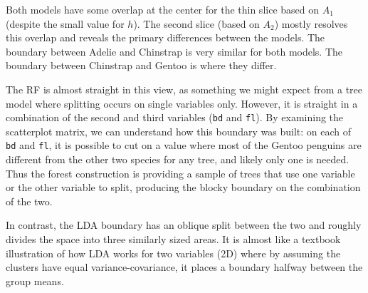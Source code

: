 \documentclass[]{interact}
\theoremstyle{plain}%
\theoremstyle{definition}
\theoremstyle{remark}
\begin{document}
Both models have some overlap at the center for the thin slice based on
\(A_1\) (despite the small value for \(h\)). The second slice (based on
\(A_2\)) mostly resolves this overlap and reveals the primary
differences between the models. The boundary between Adelie and
Chinstrap is very similar for both models. The boundary between
Chinstrap and Gentoo is where they differ.

The RF is almost straight in this view, as something we might expect
from a tree model where splitting occurs on single variables only.
However, it is straight in a combination of the second and third
variables (\texttt{bd} and \texttt{fl}). By examining the scatterplot
matrix, we can understand how this boundary was built: on each of
\texttt{bd} and \texttt{fl}, it is possible to cut on a value where most
of the Gentoo penguins are different from the other two species for any
tree, and likely only one is needed. Thus the forest construction is
providing a sample of trees that use one variable or the other variable
to split, producing the blocky boundary on the combination of the two.

In contrast, the LDA boundary has an oblique split between the two and
roughly divides the space into three similarly sized areas. It is almost
like a textbook illustration of how LDA works for two variables (2D)
where by assuming the clusters have equal variance-covariance, it places
a boundary halfway between the group means.
\end{document}
